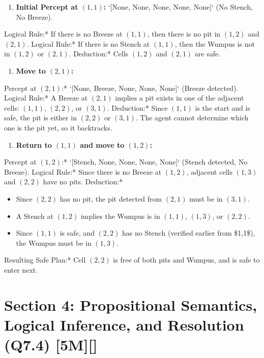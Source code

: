 \begin{enumerate}
  \item \textbf{Initial Percept at $(1,1)$:} `[None, None, None, None, None]` (No Stench, No Breeze).
\end{enumerate}
    \textit{   }Logical Rule:* If there is no Breeze at $(1,1)$, then there is no pit in $(1,2)$ and $(2,1)$.
    \textit{   }Logical Rule:* If there is no Stench at $(1,1)$, then the Wumpus is not in $(1,2)$ or $(2,1)$.
    \textit{   }Deduction:* Cells \textbf{$(1,2)$} and \textbf{$(2,1)$} are safe.
\begin{enumerate}
  \item \textbf{Move to $(2,1)$:}
\end{enumerate}
    \textit{   }Percept at $(2,1)$:* `[None, Breeze, None, None, None]` (Breeze detected).
    \textit{   }Logical Rule:* A Breeze at $(2,1)$ implies a pit exists in one of the adjacent cells: $(1,1)$, $(2,2)$, or $(3,1)$.
    \textit{   }Deduction:* Since $(1,1)$ is the start and is safe, the pit is either in $(2,2)$ or $(3,1)$. The agent cannot determine which one is the pit yet, so it backtracks.
\begin{enumerate}
  \item \textbf{Return to $(1,1)$ and move to $(1,2)$:}
\end{enumerate}
    \textit{   }Percept at $(1,2)$:* `[Stench, None, None, None, None]` (Stench detected, No Breeze).
    \textit{   }Logical Rule:* Since there is no Breeze at $(1,2)$, adjacent cells $(1,3)$ and $(2,2)$ have no pits.
    \textit{   }Deduction:*
\begin{itemize}
  \item   Since $(2,2)$ has no pit, the pit detected from $(2,1)$ must be in \textbf{$(3,1)$}.
  \item   A Stench at $(1,2)$ implies the Wumpus is in $(1,1)$, $(1,3)$, or $(2,2)$.
  \item   Since $(1,1)$ is safe, and $(2,2)$ has no Stench (verified earlier from \$1,1\$), the Wumpus must be in \textbf{$(1,3)$}.
\end{itemize}
    \textit{   }Resulting Safe Plan:* Cell \textbf{$(2,2)$} is free of both pits and Wumpus, and is safe to enter next.


\section{Section 4: Propositional Semantics, Logical Inference, and Resolution (Q7.4) [5M][]}

